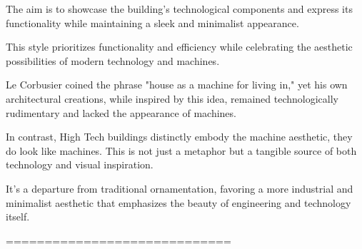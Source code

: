 The aim is to showcase the building's technological components and express its functionality while maintaining a sleek and minimalist appearance.

This style prioritizes functionality and efficiency while celebrating the aesthetic possibilities of modern technology and machines.

Le Corbusier coined the phrase "house as a machine for living in," yet his own architectural creations, while inspired by this idea, remained technologically rudimentary and lacked the appearance of machines.

In contrast, High Tech buildings distinctly embody the machine aesthetic, they do look like machines.
This is not just a metaphor but a tangible source of both technology and visual inspiration\cite{Davies1988}.

It's a departure from traditional ornamentation, favoring a more industrial and minimalist aesthetic that emphasizes the beauty of engineering and technology itself.



=============================









